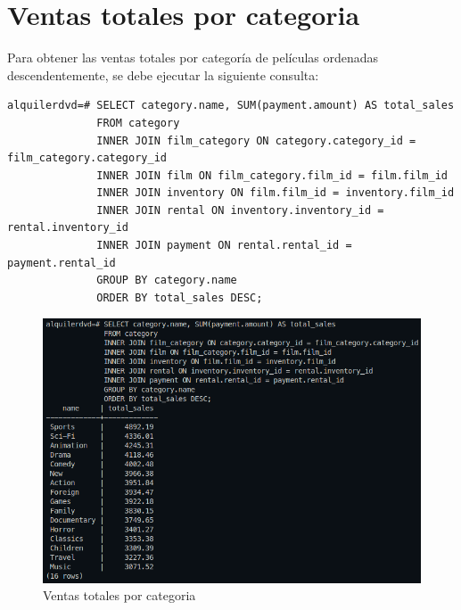 \documentclass{report}
\begin{document}
\section{Ventas totales por categoria}
Para obtener las ventas totales por categoría de películas ordenadas descendentemente, se debe ejecutar la siguiente consulta:
\begin{verbatim}
alquilerdvd=# SELECT category.name, SUM(payment.amount) AS total_sales
              FROM category
              INNER JOIN film_category ON category.category_id = film_category.category_id
              INNER JOIN film ON film_category.film_id = film.film_id
              INNER JOIN inventory ON film.film_id = inventory.film_id
              INNER JOIN rental ON inventory.inventory_id = rental.inventory_id
              INNER JOIN payment ON rental.rental_id = payment.rental_id
              GROUP BY category.name
              ORDER BY total_sales DESC;
\end{verbatim}
\begin{figure}[H]
  \centering
  \includegraphics[scale=0.48]{img/querie_a.png}
  \caption{Ventas totales por categoria}
  \label{fig:ventas totales por categoria}
\end{figure}

\cleardoublepage

\end{document}
